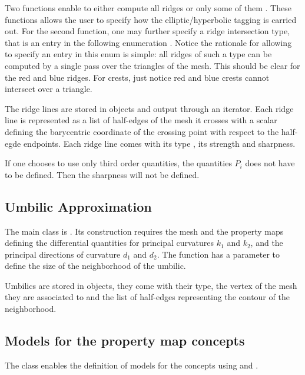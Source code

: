 Two functions enable to either compute all ridges
 or only some of them
. 
These functions allows the user to specify how the elliptic/hyperbolic
tagging is carried out.  For the second function, one may further
specify a ridge intersection type, that is an entry in the following
enumeration . 
Notice the rationale for allowing to specify an entry in this enum is
simple: all ridges of such a type can be computed by a single pass
over the triangles of the mesh. This should be clear for the red and
blue ridges. For crests, just notice red and blue crests cannot
intersect over a triangle.
\medskip

The ridge lines are stored in
 objects and output through an iterator. 
Each ridge line is represented as a list of half-edges of the mesh it
crosses with a scalar defining the barycentric coordinate of the
crossing point with respect to the half-egde endpoints. Each ridge
line comes with its type , its strength and sharpness.

If one chooses to use only third order quantities, the quantities
$P_i$ does not have to be defined. Then the sharpness will not be
defined.

\subsection{Umbilic Approximation}
The main class is
.
Its construction requires the mesh and the property maps defining the
differential quantities for principal curvatures $k_1$ and $k_2$, and
the principal directions of curvature $d_1$ and $d_2$.  The function
 has a parameter to define the size of the neighborhood of the umbilic.

Umbilics are stored in  objects, they come with their
type, the vertex of the mesh they are associated to and the list of
half-edges representing the contour of the neighborhood.


\subsection{Models for the property map concepts}
The class
enables the definition of models for the concepts
using  and .


